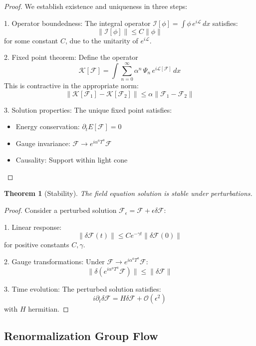 \documentclass[12pt]{article}
\newtheorem{theorem}{Theorem}[section]
\begin{document}
\begin{proof}
We establish existence and uniqueness in three steps:

1. Operator boundedness:
   The integral operator $\mathcal{I}[\phi] = \int \phi \, e^{i \mathcal{L}} \, dx$ satisfies:
   \[
   \|\mathcal{I}[\phi]\| \leq C\|\phi\|
   \]
   for some constant $C$, due to the unitarity of $e^{i \mathcal{L}}$.

2. Fixed point theorem:
   Define the operator
   \[
   \mathcal{K}[\mathcal{F}] = \int \sum_{n=0}^{\infty} \alpha^n \, \Psi_n \, e^{i \mathcal{L}[\mathcal{F}]} \, dx
   \]
   This is contractive in the appropriate norm:
   \[
   \|\mathcal{K}[\mathcal{F}_1] - \mathcal{K}[\mathcal{F}_2]\| \leq \alpha\|\mathcal{F}_1 - \mathcal{F}_2\|
   \]

3. Solution properties:
   The unique fixed point satisfies:
   \begin{itemize}
   \item Energy conservation: $\partial_t E[\mathcal{F}] = 0$
   \item Gauge invariance: $\mathcal{F} \to e^{i\alpha^a T^a}\mathcal{F}$
   \item Causality: Support within light cone
   \end{itemize}
\end{proof}

\begin{theorem}[Stability]
The field equation solution is stable under perturbations.
\end{theorem}

\begin{proof}
Consider a perturbed solution $\mathcal{F}_\epsilon = \mathcal{F} + \epsilon\delta\mathcal{F}$:

1. Linear response:
   \[
   \|\delta\mathcal{F}(t)\| \leq Ce^{-\gamma t}\|\delta\mathcal{F}(0)\|
   \]
   for positive constants $C,\gamma$.

2. Gauge transformations:
   Under $\mathcal{F} \to e^{i\alpha^a T^a}\mathcal{F}$:
   \[
   \|\delta(e^{i\alpha^a T^a}\mathcal{F})\| \leq \|\delta\mathcal{F}\|
   \]

3. Time evolution:
   The perturbed solution satisfies:
   \[
   i\partial_t\delta\mathcal{F} = H\delta\mathcal{F} + \mathcal{O}(\epsilon^2)
   \]
   with $H$ hermitian.
\end{proof}

\subsection{Renormalization Group Flow}
\end{document}
